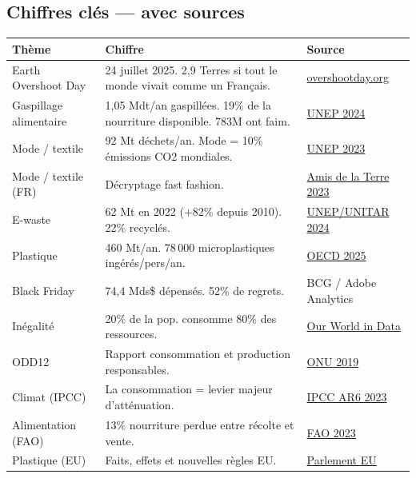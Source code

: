 \documentclass[a4paper,11pt]{article}
\newcommand{\tableheader}{\rowcolor{tableHeader}\bfseries}
\begin{document}
\subsection{Chiffres clés — avec sources}

{\footnotesize
\begin{tcolorbox}[card]
\begin{tabularx}{\textwidth}{@{}lXl@{}}
\toprule
\tableheader Thème & Chiffre & Source \\
\midrule
Earth Overshoot Day & 24 juillet 2025. 2,9 Terres si tout le monde vivait comme un Français. & \href{https://www.overshootday.org/}{overshootday.org} \\
Gaspillage alimentaire & 1,05 Mdt/an gaspillées. 19\% de la nourriture disponible. 783M ont faim. & \href{https://www.unep.org/resources/publication/food-waste-index-report-2024}{UNEP 2024} \\
Mode / textile & 92 Mt déchets/an. Mode = 10\% émissions CO2 mondiales. & \href{https://www.unep.org/news-and-stories/story/environmental-costs-fast-fashion}{UNEP 2023} \\
Mode / textile (FR) & Décryptage fast fashion. & \href{https://www.amisdelaterre.org/wp-content/uploads/2023/06/decryptage-fast-fashion-vdef.pdf}{Amis de la Terre 2023} \\
E-waste & 62 Mt en 2022 (+82\% depuis 2010). 22\% recyclés. & \href{https://ewastemonitor.info/}{UNEP/UNITAR 2024} \\
Plastique & 460 Mt/an. 78\,000 microplastiques ingérés/pers/an. & \href{https://www.oecd.org/en/topics/plastics.html}{OECD 2025} \\
Black Friday & 74,4 Mds\$ dépensés. 52\% de regrets. & BCG / Adobe Analytics \\
Inégalité & 20\% de la pop. consomme 80\% des ressources. & \href{https://ourworldindata.org/}{Our World in Data} \\
ODD12 & Rapport consommation et production responsables. & \href{https://www.un.org/sustainabledevelopment/fr/wp-content/uploads/sites/4/2020/03/ODD_12_Rapport2019.pdf}{ONU 2019} \\
Climat (IPCC) & La consommation = levier majeur d'atténuation. & \href{https://www.ipcc.ch/report/ar6/syr/}{IPCC AR6 2023} \\
Alimentation (FAO) & 13\% nourriture perdue entre récolte et vente. & \href{https://www.fao.org/food-loss-and-food-waste/en/}{FAO 2023} \\
Plastique (EU) & Faits, effets et nouvelles règles EU. & \href{https://www.europarl.europa.eu/topics/en/article/20181212STO21610/plastic-waste-and-recycling-in-the-eu-facts-and-figures}{Parlement EU} \\

\end{tabularx}
\end{tcolorbox}}
\end{document}
